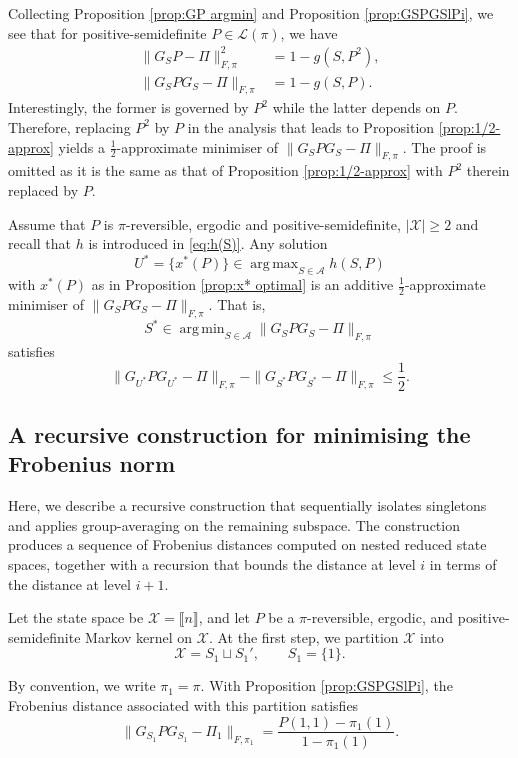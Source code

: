 \documentclass[EJP]{ejpecp} %
\DeclareMathOperator*{\argmin}{arg\,min}
\DeclareMathOperator*{\argmax}{arg\,max}
\begin{document}
Collecting Proposition \ref{prop:GP argmin} and Proposition \ref{prop:GSPGSlPi}, we see that for positive-semidefinite $P \in \mathcal{L}(\pi)$, we have
\begin{align*}
    \|G_SP - \Pi\|_{F, \pi}^2 &= 1 - g(S,P^2), \\
    \|G_SPG_S - \Pi\|_{F, \pi} &= 1 - g(S,P). 
\end{align*}
Interestingly, the former is governed by $P^2$ while the latter depends on $P$. Therefore, replacing $P^2$ by $P$ in the analysis that leads to Proposition \ref{prop:1/2-approx} yields a $\frac{1}{2}$-approximate minimiser of $\|G_SPG_S - \Pi\|_{F, \pi}$. The proof is omitted as it is the same as that of Proposition \ref{prop:1/2-approx} with $P^2$ therein replaced by $P$.
\begin{proposition} \label{prop:1/2-approxGPG}
    Assume that $P$ is $\pi$-reversible, ergodic and positive-semidefinite, $|\mathcal{X}| \geq 2$ and recall that $h$ is introduced in \eqref{eq:h(S)}. Any solution
    $$U^* = \{x^*(P)\} \in \argmax_{S\in \mathcal{A}} h(S,P)$$
    with $x^*(P)$ as in Proposition \ref{prop:x* optimal} is an additive $\frac{1}{2}$-approximate minimiser of $\|G_SPG_S - \Pi\|_{F, \pi}$. That is, 
    $$S^* \in \argmin_{S\in \mathcal{A}} \|G_S P G_S - \Pi\|_{F, \pi}$$ 
    satisfies 
    $$\|G_{U^*}PG_{U^*} - \Pi\|_{F, \pi} - \|G_{S^*}PG_{S^*} - \Pi\|_{F, \pi} \leq \frac{1}{2}.$$
\end{proposition}

\subsection{A recursive construction for minimising the Frobenius norm}
Here, we describe a recursive construction that sequentially isolates singletons and applies
group-averaging on the remaining subspace. The construction produces a sequence of Frobenius distances computed on nested reduced state spaces, together with a recursion that bounds the distance at level $i$ in terms of the distance at level $i+1$.

Let the state space be $\mathcal{X} = \llbracket n\rrbracket$, and let $P$ be a $\pi$-reversible, ergodic, and positive-semidefinite Markov kernel on $\mathcal{X}$. At the first step, we partition $\mathcal{X}$ into
$$\mathcal{X}=S_1\sqcup S_1', \qquad S_1=\{1\}.$$

By convention, we write $\pi_1 = \pi.$ With Proposition \ref{prop:GSPGSlPi}, the Frobenius distance associated with this partition satisfies
$$\|G_{S_1}PG_{S_1}-\Pi_1\|_{F,\pi_1} = \frac{P(1,1)-\pi_1(1)}{1-\pi_1(1)}.$$
\end{document}
